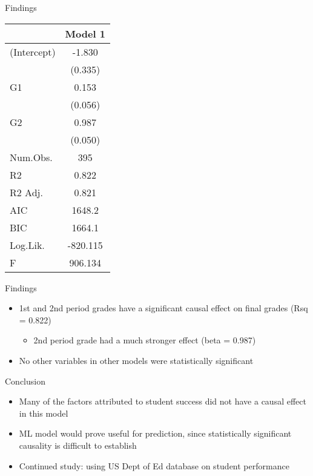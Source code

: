 \documentclass[
  ignorenonframetext,
]{beamer}
\providecommand{\tightlist}{%
  \setlength{\itemsep}{0pt}\setlength{\parskip}{0pt}}
\begin{document}
\begin{frame}{Findings}
   \begin{table}
\centering
\begin{tabular}[t]{lc}
\toprule
  & Model 1\\
\midrule
(Intercept) & -1.830\\
 & (0.335)\\
G1 & 0.153\\
 & (0.056)\\
G2 & 0.987\\
 & (0.050)\\
\midrule
Num.Obs. & 395\\
R2 & 0.822\\
R2 Adj. & 0.821\\
AIC & 1648.2\\
BIC & 1664.1\\
Log.Lik. & -820.115\\
F & 906.134\\
\bottomrule
\end{tabular}
\end{table}

\end{frame}

\begin{frame}{Findings}
\protect\hypertarget{findings}{}

\begin{itemize}
\tightlist
\item
  1st and 2nd period grades have a significant causal effect on final
  grades (Rsq = 0.822)

  \begin{itemize}
  \tightlist
  \item
    2nd period grade had a much stronger effect (beta = 0.987)
  \end{itemize}
\item
  No other variables in other models were statistically significant
\end{itemize}

\end{frame}

\begin{frame}{Conclusion}
\protect\hypertarget{conclusion}{}

\begin{itemize}
\tightlist
\item
  Many of the factors attributed to student success did not have a causal effect in this model
\item
  ML model would prove useful for prediction, since statistically significant causality is difficult to establish
\item
  Continued study: using US Dept of Ed database on student performance
\end{itemize}

\end{frame}
\end{document}
